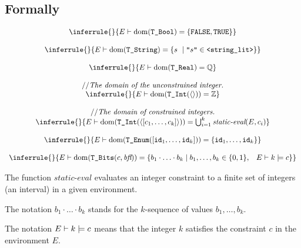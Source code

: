 \documentclass{book}
\newcommand\RuleComment[1]{// \textit{#1}}
\newcommand\unconstrainedinteger[0]{\TInt(\langle\rangle)}
\newcommand\staticeval[0]{\textit{static-eval}}
\begin{document}
\begin{emptyformal}
      \subsection{Formally}
      
\[
\begin{array}{c}
\inferrule{}{ E \entails \dom(\TBool) = \{\texttt{FALSE}, \texttt{TRUE}\} }\\
\\
\inferrule{}{ E \entails \dom(\TString) = \{ s\ \;|\; \texttt{"}s\texttt{"} \in \texttt{<string\_lit>} \} }\\
\\
\inferrule{}{ E \entails \dom(\TReal) = \Q }\\
\\
\RuleComment{The domain of the unconstrained integer.}\\
\inferrule{}{ E \entails \dom(\unconstrainedinteger) = \Z }\\
\\
\RuleComment{The domain of constrained integers.}\\
\inferrule{}{ E \entails \dom(\TInt(\langle [c_1,\ldots,c_k] \rangle)) = \bigcup_{i=1}^k \staticeval(E, c_i)}\\
\\
\inferrule{}{ E \entails \dom(\TEnum([\id_1,\ldots,\id_k])) = \{\id_1,\ldots,\id_k\}}\\
\\
\inferrule{}{ E \entails \dom(\TBits(c, \textit{bfl})) = \{ b_1\cdot\ldots\cdot b_k \;|\; b_1,\ldots,b_k \in \{0,1\}, \;\;\; E \entails k \models c   \} }\\
\end{array}
\]

The function $\staticeval$ evaluates an integer constraint to a finite set of integers (an interval) in a given environment.

The notation $b_1\cdot\ldots\cdot b_k$ stands for the $k$-sequence of values $b_1,\ldots,b_k$.

The notation $E \vdash k \models c$ means that the integer $k$ satisfies the constraint $c$ in the environment $E$. 

\end{emptyformal}

\end{document}
